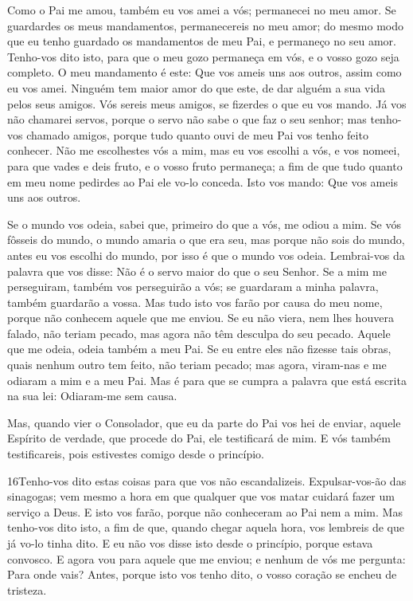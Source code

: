 Como o Pai me amou, também eu vos amei a vós; permanecei no meu
amor. Se guardardes os meus mandamentos, permanecereis no meu
amor; do mesmo modo que eu tenho guardado os mandamentos de meu Pai,
e permaneço no seu amor. Tenho-vos dito isto, para que o meu
gozo permaneça em vós, e o vosso gozo seja completo. O meu
mandamento é este: Que vos ameis uns aos outros, assim como eu vos
amei. Ninguém tem maior amor do que este, de dar alguém a sua
vida pelos seus amigos. Vós sereis meus amigos, se fizerdes o
que eu vos mando. Já vos não chamarei servos, porque o servo
não sabe o que faz o seu senhor; mas tenho-vos chamado amigos,
porque tudo quanto ouvi de meu Pai vos tenho feito conhecer.
Não me escolhestes vós a mim, mas eu vos escolhi a vós, e vos
nomeei, para que vades e deis fruto, e o vosso fruto permaneça; a
fim de que tudo quanto em meu nome pedirdes ao Pai ele vo-lo
conceda. Isto vos mando: Que vos ameis uns aos outros.

Se o mundo vos odeia, sabei que, primeiro do que a vós, me odiou
a mim. Se vós fôsseis do mundo, o mundo amaria o que era seu,
mas porque não sois do mundo, antes eu vos escolhi do mundo, por
isso é que o mundo vos odeia. Lembrai-vos da palavra que vos
disse: Não é o servo maior do que o seu Senhor. Se a mim me
perseguiram, também vos perseguirão a vós; se guardaram a minha
palavra, também guardarão a vossa. Mas tudo isto vos farão
por causa do meu nome, porque não conhecem aquele que me enviou.
Se eu não viera, nem lhes houvera falado, não teriam pecado,
mas agora não têm desculpa do seu pecado. Aquele que me
odeia, odeia também a meu Pai. Se eu entre eles não fizesse
tais obras, quais nenhum outro tem feito, não teriam pecado; mas
agora, viram-nas e me odiaram a mim e a meu Pai. Mas é para
que se cumpra a palavra que está escrita na sua lei: Odiaram-me sem
causa.

Mas, quando vier o Consolador, que eu da parte do Pai vos hei de
enviar, aquele Espírito de verdade, que procede do Pai, ele
testificará de mim. E vós também testificareis, pois
estivestes comigo desde o princípio.

\medskip

\lettrine{16} Tenho-vos dito estas coisas para que vos não
escandalizeis. Expulsar-vos-ão das sinagogas; vem mesmo a hora
em que qualquer que vos matar cuidará fazer um serviço a Deus. E
isto vos farão, porque não conheceram ao Pai nem a mim. Mas
tenho-vos dito isto, a fim de que, quando chegar aquela hora, vos
lembreis de que já vo-lo tinha dito. E eu não vos disse isto desde o
princípio, porque estava convosco. E agora vou para aquele que
me enviou; e nenhum de vós me pergunta: Para onde vais? Antes,
porque isto vos tenho dito, o vosso coração se encheu de tristeza.

